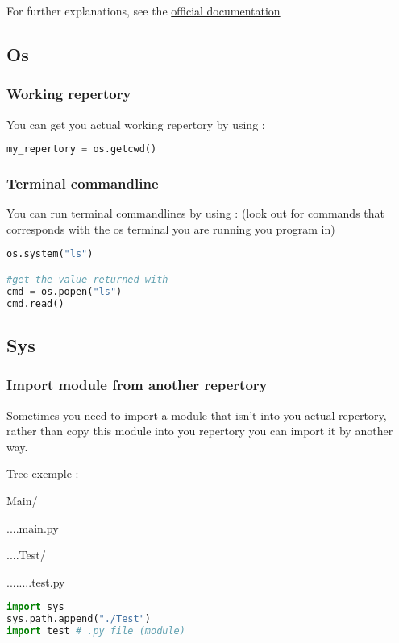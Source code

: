 \documentclass[a4paper, 12pt, titlepage]{scrartcl} %
\begin{document}
\vspace{5mm}

For further explanations, see the \href{https://docs.python.org/3/library/hashlib.html}{official documentation}


\subsection{Os}
\subsubsection{Working repertory}
You can get you actual working repertory by using :
\begin{lstlisting}[language=Python]
my_repertory = os.getcwd()
\end{lstlisting} \vspace{5mm}

\subsubsection{Terminal commandline}
You can run terminal commandlines by using : (look out for commands that corresponds with the os terminal you are running you program in)
\begin{lstlisting}[language=Python]
os.system("ls")

#get the value returned with
cmd = os.popen("ls")
cmd.read()
\end{lstlisting} \vspace{5mm}

\subsection{Sys}
\subsubsection{Import module from another repertory}
Sometimes you need to import a module that isn't into you actual repertory, rather than copy this module into you repertory you can import it by another way. 

\vspace{5mm}

Tree exemple : 

Main/ 

....main.py 

....Test/ 

........test.py 

\begin{lstlisting}[language=Python]
import sys
sys.path.append("./Test")
import test # .py file (module)
\end{lstlisting} \vspace{5mm}
\end{document}
